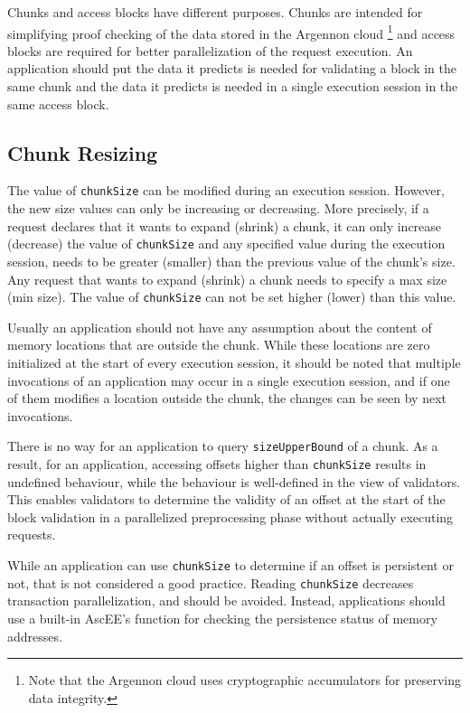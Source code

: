 Chunks and access blocks have different purposes. Chunks are intended for simplifying proof checking of the data
stored in the Argennon cloud \footnote{Note that
the Argennon cloud uses cryptographic accumulators for preserving data integrity.} and access blocks are
required for better parallelization of the request execution. An application should put the data it predicts is
needed for validating a block in the same chunk and the data it predicts is needed in a single execution
session in the same access block.

\subsection{Chunk Resizing}\label{subsec:ch-resize}


The value of \texttt{chunkSize} can be modified during an execution session. However, the new size values can only be
increasing or decreasing. More precisely, if a request declares that it wants to expand (shrink) a chunk, it can only
increase (decrease) the value of \texttt{chunkSize} and any specified value during the execution
session, needs to be greater (smaller) than the previous value of the chunk's size. Any request that wants to expand
(shrink) a chunk needs to specify a max size (min size). The value of \texttt{chunkSize} can not be set higher
(lower) than this value.

Usually an application should not have any assumption about the content of memory locations that are outside the chunk.
While these locations are zero initialized at the start of every execution session, it should be noted that multiple
invocations of an application may occur in a single execution session, and if one of them modifies a location outside
the chunk, the changes can be seen by next invocations.

There is no way for an application to query \texttt{sizeUpperBound} of a chunk. As a result, for an application,
accessing offsets higher than \texttt{chunkSize} results in undefined behaviour, while the behaviour is well-defined
in the view of validators.
This enables validators to determine the validity of an offset at the start of the block validation in a parallelized
preprocessing phase without actually executing requests.

While an application can use \texttt{chunkSize} to determine if an offset is persistent or not, that is not
considered a good practice. Reading \texttt{chunkSize} decreases transaction parallelization, and should be avoided.
Instead, applications should use a built-in AscEE's function for checking the persistence status of memory addresses.

